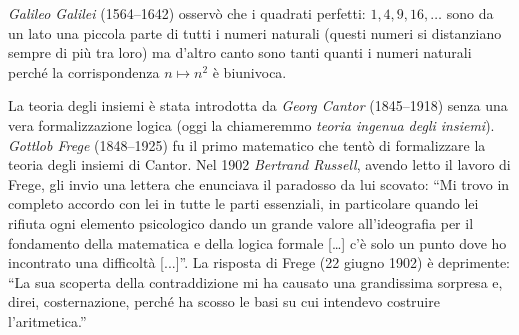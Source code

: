 \label{nota:Galileo}%
%
\emph{Galileo Galilei} (1564--1642) osservò che i quadrati 
perfetti: $1,4,9,16,\dots$ sono da un lato una piccola parte 
di tutti i numeri naturali (questi numeri si distanziano 
sempre di più tra loro) ma d'altro canto sono tanti quanti i numeri naturali 
perché la corrispondenza $n\mapsto n^2$ è biunivoca.

\label{nota:Cantor}%
%
\label{nota:Russell}%
%
\label{nota:Frege}%
%
La teoria degli insiemi
è stata introdotta da \emph{Georg Cantor} (1845--1918) senza una vera formalizzazione logica
(oggi la chiameremmo \emph{teoria ingenua degli insiemi}).
\emph{Gottlob Frege} (1848--1925) fu il primo matematico che tentò di formalizzare 
la teoria degli insiemi di Cantor. 
Nel 1902 \emph{Bertrand Russell}, avendo letto il lavoro di Frege, 
gli invio una lettera che enunciava il paradosso da lui scovato:
``Mi trovo in completo accordo con lei in tutte le parti essenziali, in particolare
quando lei rifiuta ogni elemento psicologico dando un grande valore
all'ideografia %
per il fondamento della matematica e della logica formale [\dots] c'è solo
un punto dove ho incontrato una difficoltà [...]''.
La risposta di Frege (22 giugno 1902) è deprimente:
``La sua scoperta della contraddizione mi ha causato una grandissima sorpresa e,
direi, costernazione, perché ha scosso le basi su cui intendevo costruire l'aritmetica.''
